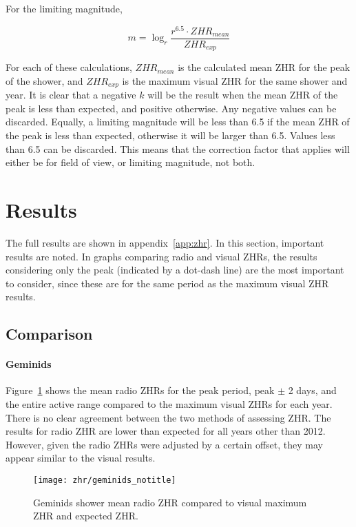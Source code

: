 For the limiting magnitude,

\[ m =  \log_r \frac{r^{6.5} \cdot {ZHR}_{mean}}{{ZHR}_{exp}} \]

For each of these calculations, $ZHR_{mean}$ is the calculated mean ZHR for the
peak of the shower, and $ZHR_{exp}$ is the maximum visual ZHR for the same
shower and year.  It is clear that a negative $k$ will be the result when the
mean ZHR of the peak is less than expected, and positive otherwise. Any
negative values can be discarded. Equally, a limiting magnitude will be less
than 6.5 if the mean ZHR of the peak is less than expected, otherwise it will
be larger than 6.5. Values less than 6.5 can be discarded. This means that the
correction factor that applies will either be for field of view, or limiting
magnitude, not both.

\section{Results}

The full results are shown in appendix~\ref{app:zhr}. In this section,
important results are noted. In graphs comparing radio and visual ZHRs, the
results considering only the peak (indicated by a dot-dash line) are the most
important to consider, since these are for the same period as the maximum visual
ZHR results.

\subsection{Comparison}

\paragraph{Geminids\\}

Figure~\ref{fig:zhr:gem} shows the mean radio ZHRs for the peak period, peak
$\pm$ 2 days, and the entire active range compared to the maximum visual ZHRs
for each year. There is no clear agreement between the two methods of assessing
ZHR.  The results for radio ZHR are lower than expected for all years other than
2012. However,  given the radio ZHRs were adjusted by a certain offset, they may
appear similar to the visual results.

\begin{figure}[h!] 
	\centering
	\texttt{[image: zhr/geminids\_notitle]} 
	\caption{Geminids shower mean radio ZHR compared to visual maximum ZHR and
	expected ZHR.} \label{fig:zhr:gem}	
\end{figure}

